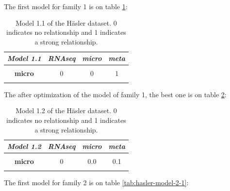 \documentclass[
  12pt,
  a4paper,
  twoside,
  openright]{book}
\begin{document}
The first model for family 1 is on table \ref{tab:hasler-model-1-1}:

\begin{table}[H]

\caption[Model 1.1 of the Häsler dataset.]{\label{tab:hasler-model-1-1}Model 1.1 of the Häsler dataset. 0 indicates no relationship and 1 indicates a strong relationship.}
\centering
\begin{tabular}[t]{|>{}c|c|c|>{}c|}
\hline
\em{\textbf{Model 1.1}} & \em{\textbf{RNAseq}} & \em{\textbf{micro}} & \em{\textbf{meta}}\\
\hline
\textbf{\cellcolor{gray!6}{RNAseq}} & \cellcolor{gray!6}{0} & \cellcolor{gray!6}{0} & \cellcolor{gray!6}{1}\\
\hline
\textbf{micro} & 0 & 0 & 1\\
\hline
\textbf{\cellcolor{gray!6}{meta}} & \cellcolor{gray!6}{1} & \cellcolor{gray!6}{1} & \cellcolor{gray!6}{0}\\
\hline
\end{tabular}
\end{table}

The after optimization of the model of family 1, the best one is on table \ref{tab:hasler-model-1-2}:

\begin{table}[H]

\caption[Model 1.2 of the Häsler dataset.]{\label{tab:hasler-model-1-2}Model 1.2 of the Häsler dataset. 0 indicates no relationship and 1 indicates a strong relationship.}
\centering
\begin{tabular}[t]{|>{}c|c|c|>{}c|}
\hline
\em{\textbf{Model 1.2}} & \em{\textbf{RNAseq}} & \em{\textbf{micro}} & \em{\textbf{meta}}\\
\hline
\textbf{\cellcolor{gray!6}{RNAseq}} & \cellcolor{gray!6}{0} & \cellcolor{gray!6}{0.0} & \cellcolor{gray!6}{1.0}\\
\hline
\textbf{micro} & 0 & 0.0 & 0.1\\
\hline
\textbf{\cellcolor{gray!6}{meta}} & \cellcolor{gray!6}{1} & \cellcolor{gray!6}{0.1} & \cellcolor{gray!6}{0.0}\\
\hline
\end{tabular}
\end{table}

The first model for family 2 is on table \ref{tab:hasler-model-2-1}:
\end{document}
